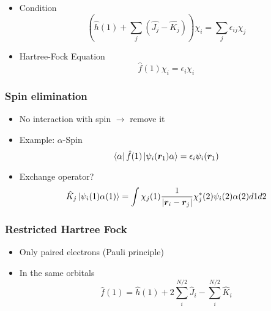 \documentclass{beamer}
\begin{document}
\begin{frame}
    \begin{itemize}
        \item Condition
        \begin{equation*}
            \left(\hat{h}(1) + \sum_j(\hat{J_j} - \hat{K_j})\right)\chi_i = \sum_{j}\epsilon_{ij}\chi_j
        \end{equation*}
        \item Hartree-Fock Equation
        \begin{equation*}
            \hat{f}(1)\chi_i = \epsilon_i\chi_i
        \end{equation*}
    \end{itemize}
\end{frame}

\begin{frame}
    \frametitle{Spin elimination}
    \begin{itemize}
        \item No interaction with spin $\rightarrow$ remove it
        \item Example: $\alpha$-Spin
        \begin{equation*}
            \bra{\alpha}\hat{f}(1)\ket{\psi_i(\boldsymbol{r}_1)\alpha} = \epsilon_i\psi_i(\boldsymbol{r}_1)
        \end{equation*}
        \item Exchange operator?
        \begin{equation*}
            \hat{K}_j\ket{\psi_i(1)\alpha(1)} = \int\chi_j(1)\frac{1}{|\boldsymbol{r}_i - \boldsymbol{r}_j|}\chi_j^*(2)\psi_i(2)\alpha(2)d1d2
        \end{equation*}
    \end{itemize}
\end{frame}

\begin{frame}
    \frametitle{Restricted Hartree Fock}
    \begin{itemize}
        \item Only paired electrons (Pauli principle)
        \item In the same orbitals
        \begin{equation*}
            \hat{f}(1) = \hat{h}(1) + 2\sum_i^{N/2}\hat{J}_i - \sum_i^{N/2}\hat{K}_i
        \end{equation*}
    \end{itemize}
\end{frame}
\end{document}
